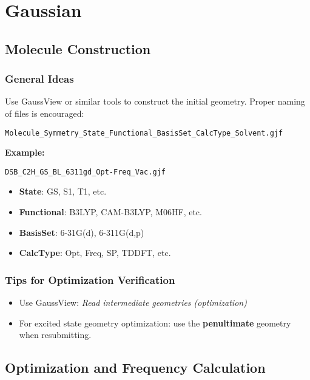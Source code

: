 \chapter{Gaussian}

\section{Molecule Construction}

\subsection*{General Ideas}
Use GaussView or similar tools to construct the initial geometry. Proper naming of files is encouraged:

\begin{verbatim}
Molecule_Symmetry_State_Functional_BasisSet_CalcType_Solvent.gjf
\end{verbatim}

\textbf{Example:}

\begin{verbatim}
DSB_C2H_GS_BL_6311gd_Opt-Freq_Vac.gjf
\end{verbatim}

\begin{itemize}
\item \textbf{State}: GS, S1, T1, etc.
\item \textbf{Functional}: B3LYP, CAM-B3LYP, M06HF, etc.
\item \textbf{BasisSet}: 6-31G(d), 6-311G(d,p)
\item \textbf{CalcType}: Opt, Freq, SP, TDDFT, etc.
\end{itemize}

\subsection*{Tips for Optimization Verification}
\begin{itemize}
\item Use GaussView: \textit{Read intermediate geometries (optimization)}
\item For excited state geometry optimization: use the \textbf{penultimate} geometry when resubmitting.
\end{itemize}

\section{Optimization and Frequency Calculation}

